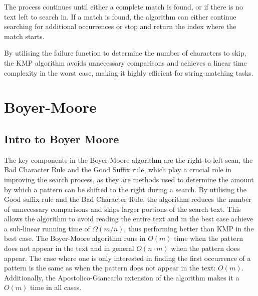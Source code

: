 The process continues until either a complete match is found, or if there is no text left to search in. If a match is found, the algorithm can either continue searching for additional occurrences or stop and return the index where the match starts.

By utilising the failure function to determine the number of characters to skip, the KMP algorithm avoids unnecessary comparisons and achieves a linear time complexity in the worst case, making it highly efficient for string-matching tasks.

\section{Boyer-Moore}

\subsection{Intro to Boyer Moore}
The key components in the Boyer-Moore algorithm are the right-to-left scan, the Bad Character Rule and the Good Suffix rule, which play a crucial role in improving the search process, as they are methods used to determine the amount by which a pattern can be shifted to the right during a search. By utilising the Good suffix rule and the Bad Character Rule, the algorithm reduces the number of unnecessary comparisons and skips larger portions of the search text. This allows the algorithm to avoid reading the entire text and in the best case achieve a sub-linear running time of $\Omega(m/n)$, thus performing better than KMP in the best case. The Boyer-Moore algorithm runs in $O(m)$ time when the pattern does not appear in the text and in general $O(n\cdot m)$ when the pattern does appear. The case where one is only interested in finding the first occurrence of a pattern is the same as when the pattern does not appear in the text: $O(m)$. Additionally, the Apostolico-Giancarlo extension of the algorithm makes it a $O(m)$ time in all cases. 

